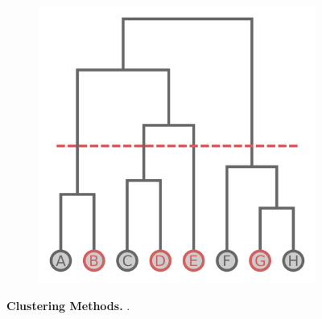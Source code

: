 \begin{figure}
\begin{adjustbox}{minipage=\dimexpr{}\fboxrule,fbox}
\begin{subfigure}[b]{0.475\textwidth}
            \label{subfig:Connectedness}            \includegraphics[width=\textwidth]{Graphics/Connectedness.pdf}
        \end{subfigure}
    \end{adjustbox}
    \caption[Clustering Methods]{\textbf{Clustering Methods.} .}
    \label{fig:Methods}
\end{figure}

\blindtext